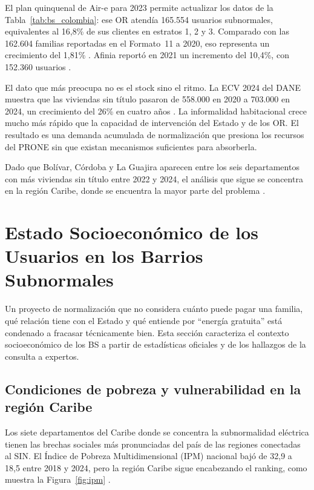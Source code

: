 El plan quinquenal de Air-e para 2023 permite actualizar los datos de la Tabla~\ref{tab:bs_colombia}: ese OR atendía 165.554 usuarios subnormales, equivalentes al 16,8\% de sus clientes en estratos 1, 2 y 3. Comparado con las 162.604 familias reportadas en el Formato~11 a 2020, eso representa un crecimiento del 1,81\% \parencite{Aire2023, SSPD2020}. Afinia reportó en 2021 un incremento del 10,4\%, con 152.360 usuarios \parencite{Afinia2021}.

El dato que más preocupa no es el stock sino el ritmo. La ECV 2024 del DANE muestra que las viviendas sin título pasaron de 558.000 en 2020 a 703.000 en 2024, un crecimiento del 26\% en cuatro años \parencite{DANE2024a}. La informalidad habitacional crece mucho más rápido que la capacidad de intervención del Estado y de los OR. El resultado es una demanda acumulada de normalización que presiona los recursos del PRONE sin que existan mecanismos suficientes para absorberla.

Dado que Bolívar, Córdoba y La Guajira aparecen entre los seis departamentos con más viviendas sin título entre 2022 y 2024, el análisis que sigue se concentra en la región Caribe, donde se encuentra la mayor parte del problema \parencite{DANE2024a}.


\section{Estado Socioeconómico de los Usuarios en los Barrios Subnormales}
\label{sec:socioeconomico}

Un proyecto de normalización que no considera cuánto puede pagar una familia, qué relación tiene con el Estado y qué entiende por ``energía gratuita'' está condenado a fracasar técnicamente bien. Esta sección caracteriza el contexto socioeconómico de los BS a partir de estadísticas oficiales y de los hallazgos de la consulta a expertos.

\subsection{Condiciones de pobreza y vulnerabilidad en la región Caribe}
\label{subsec:pobreza_caribe}

Los siete departamentos del Caribe donde se concentra la subnormalidad eléctrica tienen las brechas sociales más pronunciadas del país de las regiones conectadas al SIN. El Índice de Pobreza Multidimensional (IPM) nacional bajó de 32,9 a 18,5 entre 2018 y 2024, pero la región Caribe sigue encabezando el ranking, como muestra la Figura~\ref{fig:ipm} \parencite{DANE2024b}.

